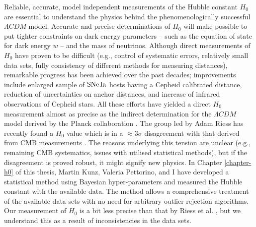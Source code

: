 Reliable, accurate, model independent measurements of the Hubble constant $H_0$ are essential to understand the physics behind the phenomenologically successful $\Lambda CDM$ model. Accurate and precise determinations of $H_0$ will make possible to put tighter constraints on dark energy parameters -- such as the equation of state for dark energy $w$ -- and the mass of neutrinos. Although direct measurements of $H_0$ have proven to be difficult (e.g., control of systematic errors, relatively small data sets, fully consistency of different methods for measuring distances), remarkable progress has been achieved over the past decades; improvements include enlarged sample of $\mathrm{SNe\,Ia}$ hosts having a Cepheid calibrated distance, reduction of uncertainties on anchor distances, and increase of infrared observations of Cepheid stars. All these efforts have yielded a direct $H_0$ measurement almost as precise as the indirect determination for the $\Lambda CDM$ model derived by the Planck collaboration . The group led by Adam Riess has recently found a $H_0$ value which is in a $\approx 3\sigma$ disagreement with that derived from CMB measurements . The reasons underlying this tension are unclear (e.g., remaining CMB systematics, issues with utilised statistical methods), but if the disagreement is proved robust, it might signify new physics.  In Chapter \ref{chapter-h0} of this thesis, Martin Kunz, Valeria Pettorino, and I have developed a statistical method using Bayesian hyper-parameters and measured the Hubble constant with the available data. The method allows a comprehensive treatment of the available data sets with no need for arbitrary outlier rejection algorithms. Our measurement of $H_0$ is a bit less precise than that by Riess et al. , but we understand this as a result of inconsistencies in the data sets. 